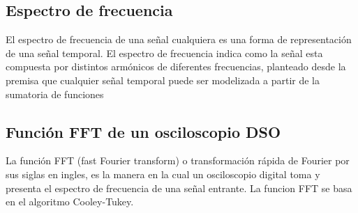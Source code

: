 \subsection{Espectro de frecuencia}
El espectro de frecuencia de una señal cualquiera es una forma de representación de una señal temporal. El espectro de frecuencia indica como la señal esta compuesta por distintos armónicos de diferentes frecuencias, planteado desde la premisa que cualquier señal temporal puede ser modelizada a partir de la sumatoria de funciones 

\subsection{Función FFT de un osciloscopio DSO}
La función FFT (fast Fourier transform) o transformación rápida de Fourier por sus siglas en ingles, es la manera en la cual un osciloscopio digital toma y presenta el espectro de frecuencia de una señal entrante. La funcion FFT se basa en el algoritmo Cooley-Tukey.